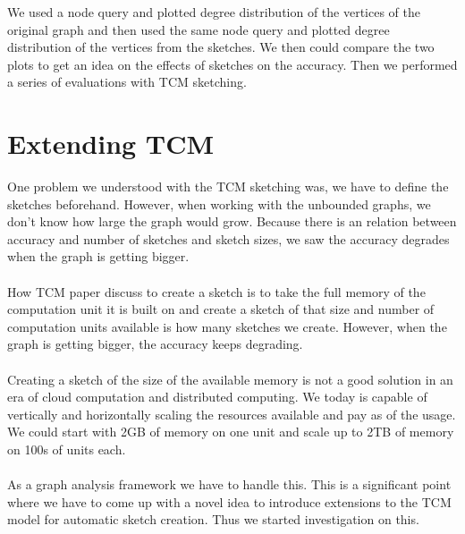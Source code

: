 \documentclass[12pt]{report}
\numberwithin{figure}{section}
\numberwithin{table}{section}
\begin{document}
We used a node query and plotted degree distribution of the vertices of the original graph and then used the same node query and plotted degree distribution of the vertices from the sketches. We then could compare the two plots to get an idea on the effects of sketches on the accuracy.  Then we performed a series of evaluations with TCM sketching. 

\section{Extending TCM}

One problem we understood with the TCM sketching was, we have to define the sketches beforehand. However, when working with the unbounded graphs, we don’t know how large the graph would grow. Because there is an relation between accuracy and number of sketches and sketch sizes, we saw the accuracy degrades when the graph is getting bigger. 

\paragraph{}

How TCM paper discuss to create a sketch is to take the full memory of the computation unit it is built on and create a sketch of that size and number of computation units available is how many sketches we create. However, when the graph is getting bigger, the accuracy keeps degrading. 

\paragraph{}

Creating a sketch of the size of the available memory is not a good solution in an era of cloud computation and distributed computing. We today is capable of vertically and horizontally scaling the resources available and pay as of the usage. We could start with 2GB of memory on one unit and scale up to 2TB of memory on 100s of units each.

\paragraph{}

As a graph analysis framework we have to handle this. This is a significant point where we have to come up with a novel idea to introduce extensions to the TCM model for automatic sketch creation. Thus we started investigation on this.
\end{document}
